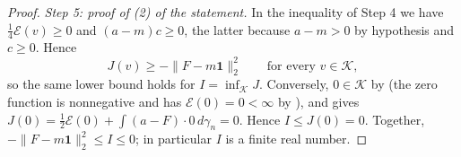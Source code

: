 \begin{proof}
\emph{Step 5: proof of (2) of the statement.}
In the inequality of Step 4 we have $\tfrac14\mathcal{E}(v) \geq 0$ and
$(a-m)c \geq 0$, the latter because $a - m > 0$ by hypothesis and $c \geq 0$.
Hence
\[
  J(v) \geq -\|F-m\mathbf{1}\|_2^2 \qquad\text{for every } v \in \mathcal{K},
\]
so the same lower bound holds for $I = \inf_{\mathcal{K}} J$.  Conversely,
$0 \in \mathcal{K}$ by  (the zero function is nonnegative
and has $\mathcal{E}(0) = 0 < \infty$ by ), and
 gives
$J(0) = \tfrac12\mathcal{E}(0) + \int (a-F)\cdot 0\, d\gamma_n = 0$.  Hence
$I \leq J(0) = 0$.  Together, $-\|F-m\mathbf{1}\|_2^2 \leq I \leq 0$; in
particular $I$ is a finite real number.
\end{proof}
